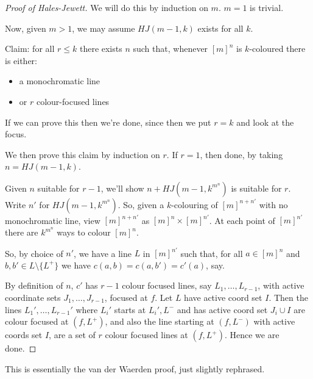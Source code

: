\documentclass[10pt,a4paper]{article}
\begin{document}
\begin{proof}[Proof of Hales-Jewett]
  We will do this by induction on $m$. $m=1$ is trivial.

  Now, given $m > 1$, we may assume $HJ(m-1, k)$ exists for all $k$.

  Claim: for all $r \leq k$ there exists $n$ such that, whenever $[m]^n$ is $k$-coloured there is either:
  \begin{itemize}
    \item a monochromatic line
    \item or $r$ colour-focused lines
  \end{itemize}
  If we can prove this then we're done, since then we put $r=k$ and look at the focus.

  We then prove this claim by induction on $r$. If $r=1$, then done, by taking $n = HJ(m-1,k)$.

  Given $n$ suitable for $r-1$, we'll show $n + HJ(m-1, k^{m^n})$ is suitable for $r$. Write $n'$ for $HJ(m-1, k^{m^n})$. So, given a $k$-colouring of $[m]^{n+n'}$ with no monochromatic line, view $[m]^{n+n'}$ as $[m]^n \times [m]^{n'}$. At each point of $[m]^{n'}$ there are $k^{m^n}$ ways to colour $[m]^n$.

  So, by choice of $n'$, we have a line $L$ in $[m]^{n'}$ such that, for all $a \in [m]^n$ and $b,b' \in L\setminus\{L^+\}$ we have $c(a,b) = c(a,b') = c'(a)$, say.

  By definition of $n$, $c'$ has $r-1$ colour focused lines, say $L_1, \ldots, L_{r-1}$, with active coordinate sets $J_1, \ldots, J_{r-1}$, focused at $f$. Let $L$ have active coord set $I$. Then the lines $L_1', \ldots, L_{r-1}'$ where $L_i'$ starts at $L_i', L^-$ and has active coord set $J_i \cup I$ are colour focused at $(f, L^+)$, and also the line starting at $(f, L^-)$ with active coords set $I$, are a set of $r$ colour focused lines at $(f, L^+)$. Hence we are done.
\end{proof}
This is essentially the van der Waerden proof, just slightly rephrased.
\end{document}
